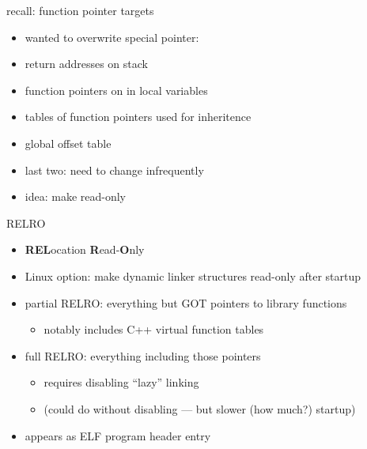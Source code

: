 \begin{frame}{recall: function pointer targets}
    \begin{itemize}
    \item wanted to overwrite special pointer:
    \vspace{.5cm}
    \item return addresses on stack
    \item function pointers on in local variables
    \item tables of function pointers used for inheritence
    \item global offset table
    \vspace{.5cm}
    \item last two: need to change infrequently
    \item idea: make read-only
    \end{itemize}
\end{frame}

\begin{frame}{RELRO}
    \begin{itemize}
        \item \textbf{REL}ocation \textbf{R}ead-\textbf{O}nly
        \item Linux option: make dynamic linker structures read-only after startup
        \item partial RELRO: everything but GOT pointers to library functions
            \begin{itemize}
            \item notably includes C++ virtual function tables
            \end{itemize}
        \item full RELRO: everything including those pointers
            \begin{itemize}
            \item requires disabling ``lazy'' linking
            \item (could do without disabling --- but slower (how much?) startup)
            \end{itemize}
        \item appears as ELF program header entry
    \end{itemize}
\end{frame}


